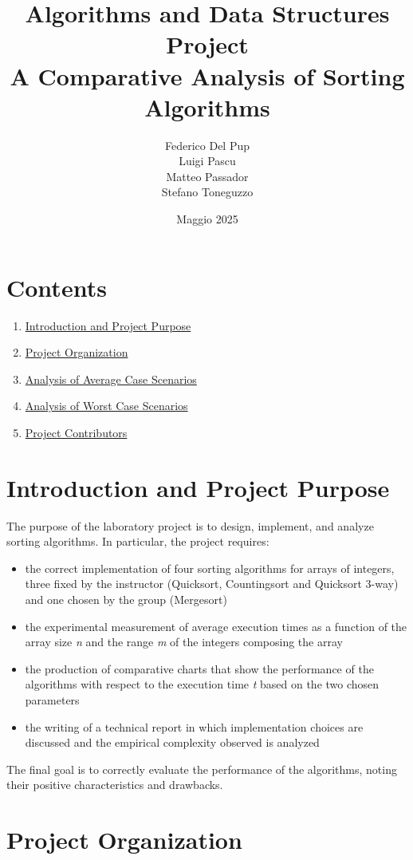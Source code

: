 \documentclass{article}
\title{Algorithms and Data Structures Project \\ \large A Comparative Analysis of Sorting Algorithms}
\author{Federico Del Pup \\
Luigi Pascu \\
Matteo Passador \\
Stefano Toneguzzo
}
\date{Maggio 2025}
\begin{document}
\maketitle

\section*{Contents}
\begin{enumerate}
\item \hyperref[sec:intro]{Introduction and Project Purpose}
\item \hyperref[sec:ling]{Project Organization}
\item \hyperref[sec:grafici]{Analysis of Average Case Scenarios}
\item \hyperref[sec:peggiori]{Analysis of Worst Case Scenarios}
\item \hyperref[sec:partecipanti]{Project Contributors}
\end{enumerate}

\label{sec:intro}

\section{Introduction and Project Purpose}
The purpose of the laboratory project is to design, implement, and analyze sorting algorithms. In particular, the project requires:
\begin{itemize}
\item the correct implementation of four sorting algorithms for arrays of integers, three fixed by the instructor (Quicksort, Countingsort and Quicksort 3-way) and one chosen by the group (Mergesort)
\item the experimental measurement of average execution times as a function of the array size \emph{n} and the range \emph{m} of the integers composing the array
\item the production of comparative charts that show the performance of the algorithms with respect to the execution time \emph{t} based on the two chosen parameters
\item the writing of a technical report in which implementation choices are discussed and the empirical complexity observed is analyzed
\end{itemize}
The final goal is to correctly evaluate the performance of the algorithms, noting their positive characteristics and drawbacks.

\label{sec:ling}
\section{Project Organization}
\end{document}
